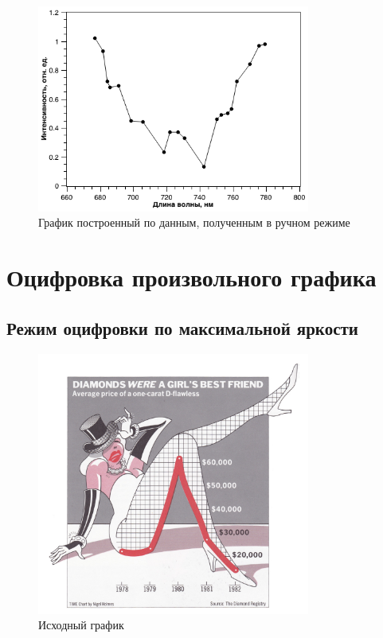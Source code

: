 \documentclass[a4paper,14pt,russian]{report}
\begin{document}
\begin{figure}[!htb]
  \centerline{\includegraphics[width=0.8\textwidth]{graph-manual}}
  \caption{График построенный по данным, полученным в ручном режиме}
  \label{graph:manual}
\end{figure}

\section{Оцифровка произвольного графика}

\subsection{Режим оцифровки по максимальной яркости}

\begin{figure}[!htb]
  \centerline{\includegraphics[width=0.8\textwidth]{graph-custom-origin}}
  \caption{Исходный график}
  \label{graph:custom-origin}
\end{figure}
\end{document}
